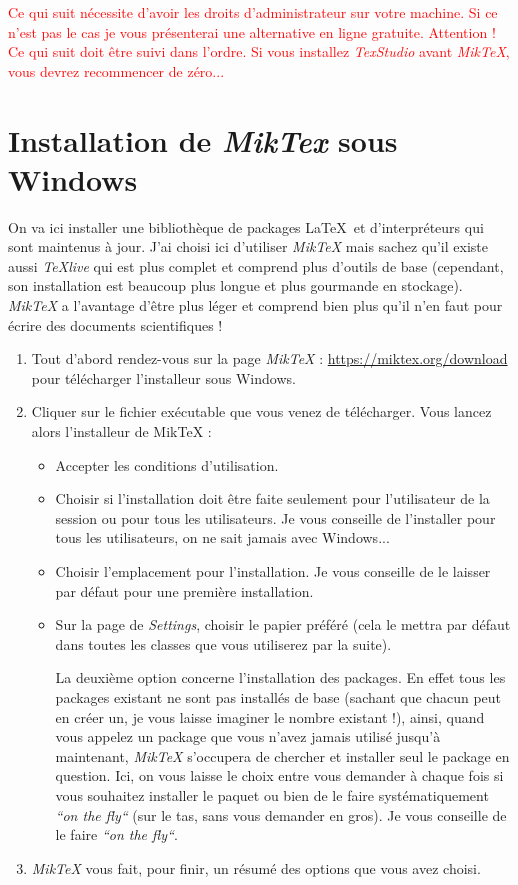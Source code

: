 \documentclass[11pt,a4paper]{article} %
\begin{document}
\textcolor{red}{Ce qui suit nécessite d'avoir les droits d'administrateur sur votre machine. Si ce n'est pas le cas je vous présenterai une alternative en ligne gratuite. Attention ! Ce qui suit doit être suivi dans l'ordre. Si vous installez \textit{TexStudio} avant \textit{MikTeX}, vous devrez recommencer de zéro...}

\section{Installation de \textit{MikTex} sous Windows}
On va ici installer une bibliothèque de packages \LaTeX\ et d'interpréteurs qui sont maintenus à jour. J'ai choisi ici d'utiliser \textit{MikTeX} mais sachez qu'il existe aussi \textit{TeXlive} qui est plus complet et comprend plus d'outils de base (cependant, son installation est beaucoup plus longue et plus gourmande en stockage). \textit{MikTeX} a l'avantage d'être plus léger et comprend bien plus qu'il n'en faut pour écrire des documents scientifiques !

\begin{enumerate}
	\item Tout d'abord rendez-vous sur la page \textit{MikTeX} : \url{https://miktex.org/download} pour télécharger l'installeur sous Windows.
	\item Cliquer sur le fichier exécutable que vous venez de télécharger. Vous lancez alors l'installeur de MikTeX :
	\begin{itemize}
		\item Accepter les conditions d'utilisation.
		\item Choisir si l'installation doit être faite seulement pour l'utilisateur de la session ou pour tous les utilisateurs. Je vous conseille de l'installer pour tous les utilisateurs, on ne sait jamais avec Windows...
		\item Choisir l'emplacement pour l'installation. Je vous conseille de le laisser par défaut pour une première installation.
		\item Sur la page de \textit{Settings}, choisir le papier préféré (cela le mettra par défaut dans toutes les classes que vous utiliserez par la suite).

		La deuxième option concerne l'installation des packages. En effet tous les packages existant ne sont pas installés de base (sachant que chacun peut en créer un, je vous laisse imaginer le nombre existant !), ainsi, quand vous appelez un package que vous n'avez jamais utilisé jusqu'à maintenant, \textit{MikTeX} s'occupera de chercher et installer seul le package en question. Ici, on vous laisse le choix entre vous demander à chaque fois si vous souhaitez installer le paquet ou bien de le faire systématiquement \textit{``on the fly``} (sur le tas, sans vous demander en gros). Je vous conseille de le faire \textit{``on the fly``}.
	\end{itemize}
		\item \textit{MikTeX} vous fait, pour finir, un résumé des options que vous avez choisi.
\end{enumerate}
\end{document}
